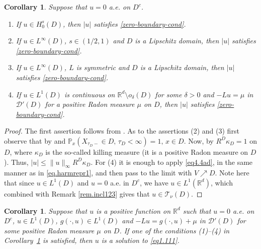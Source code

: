 \documentclass[11pt,a4paper,reqno]{amsart}
\newtheorem{corollary}[theorem]{\bf Corollary}
\theoremstyle{definition}
\numberwithin{equation}{section}
\begin{document}
\begin{corollary}
\label{col.12}
Suppose that $u=0$ a.e. on $D^c$.
\begin{enumerate}
\item  If $u\in H^s_0(D)$, then $|u|$ satisfies \eqref{zero-boundary-cond}.
\item If $u\in L^\infty(D)$, $s\in (1/2,1)$ and $D$ is  a Lipschitz domain,  then $|u|$ satisfies \eqref{zero-boundary-cond}.
\item If $u\in L^\infty(D)$, $L$ is symmetric  and $D$ is  a Lipschitz domain,  
then $|u|$ satisfies \eqref{zero-boundary-cond}.
\item If $u\in L^1(D)$ is continuous on $\mathbb R^d\setminus o_\delta(D)$ for some $\delta>0$ and $-Lu=\mu$ in $\mathscr D'(D)$
for a positive Radon measure $\mu$ on $D$, then $|u|$ satisfies \eqref{zero-boundary-cond}.
\end{enumerate} 
\end{corollary}
\begin{proof}
The first assertion follows from \cite[Theorem 1.1.1, Theorem 2.3.1]{Oshima}. As to   the assertions (2) and (3)
first observe that by 
\cite[Theorem 1]{Sztonyk2000} and \cite[Pages 228-229]{Millar1975}  $\mathbb P_x(X_{\tau_D-}\in D,\, \tau_D<\infty)=1,\, x\in D$. 
Now, by   \cite[Theorem 3.5.14(ii)]{Oshima} $R^D\kappa_D=1$ on $D$, where $\kappa_D$ is the so-called killing measure 
(it is a positive Radon measure on $D$). Thus, $|u|\le \|u\|_\infty R^D\kappa_D$. 
For (4) it is enough to apply \eqref{eq4.4ad}, in the same manner as in \eqref{eq.harmrepr1}, and then  pass to the limit with $V\nearrow D$.
Note here that since  $u\in L^1(D)$ and $u=0$ a.e. in $D^c$, we have   $u\in L^1(\mathbb R^d)$,
which combined with Remark \ref{rem.incl123} gives that $u\in\mathscr T_\nu(D)$.
\end{proof}

\begin{corollary}
Suppose that $u$ is a positive function on $\mathbb R^d$
such that  $u=0$ a.e. on $D^c$, $u\in L^1(D)$,  $g(\cdot,u)\in L^1(D)$ and  
$-Lu=g(\cdot,u)+\mu$ in $\mathscr D'(D)$ for some positive Radon measure $\mu$ on $D$.    
If one   of the conditions  (1)--(4) in  Corollary~\ref{col.12} is satisfied, then $u$ is a solution to \eqref{eq1.111}.
\end{corollary}
\end{document}
